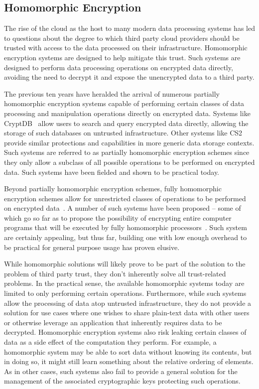 \subsection{Homomorphic Encryption}

The rise of the cloud as the host to many modern data processing
systems has led to questions about the degree to which third party
cloud providers should be trusted with access to the data processed on
their infrastructure. Homomorphic encryption systems are designed to
help mitigate this trust. Such systems are designed to perform data
processing operations on encrypted data directly, avoiding the need to
decrypt it and expose the unencrypted data to a third party.

The previous ten years have heralded the arrival of numerous partially
homomorphic encryption systems capable of performing certain classes
of data processing and manipulation operations directly on encrypted
data. Systems like CryptDB~\cite{popa2011} allow users to search and
query encrypted data directly, allowing the storage of such databases
on untrusted infrastructure. Other systems like CS2~\cite{kamara2011}
provide similar protections and capabilities in more generic data
storage contexts. Such systems are referred to as partially
homomorphic encryption schemes since they only allow a subclass of all
possible operations to be performed on encrypted data. Such systems
have been fielded and shown to be practical today.

Beyond partially homomorphic encryption schemes, fully homomorphic
encryption schemes allow for unrestricted classes of operations to be
performed on encrypted data~\cite{gentry2009}. A number of such
systems have been proposed -- some of which go so far as to propose
the possibility of encrypting entire computer programs that will be
executed by fully homomorphic processors~\cite{Breuer2013,
  Brenner2011}. Such system are certainly appealing, but thus far,
building one with low enough overhead to be practical for general
purpose usage has proven elusive.

While homomorphic solutions will likely prove to be part of the
solution to the problem of third party trust, they don't inherently
solve all trust-related problems. In the practical sense, the
available homomorphic systems today are limited to only performing
certain operations. Furthermore, while such systems allow the
processing of data atop untrusted infrastructure, they do not provide
a solution for use cases where one wishes to share plain-text data
with other users or otherwise leverage an application that inherently
requires data to be decrypted. Homomorphic encryption systems also
risk leaking certain classes of data as a side effect of the
computation they perform. For example, a homomorphic system may be
able to sort data without knowing its contents, but in doing so, it
might still learn something about the relative ordering of
elements. As in other cases, such systems also fail to provide a
general solution for the management of the associated cryptographic
keys protecting such operations.

